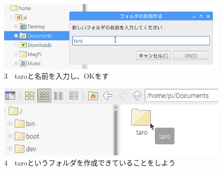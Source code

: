 \documentclass[a4paper,12pt]{jarticle}
\begin{document}
\begin{figure}[ht]
  \centering
  \begin{minipage}{0.8\textwidth}
  \includegraphics[width=\linewidth]{textbook-img039.png}
    3　taroと名前を入力し、OKをす
  \end{minipage}
  \vspace{\baselineskip}

  \centering
  \begin{minipage}{0.8\textwidth}
  \includegraphics[width=\linewidth]{textbook-img040.png}
    4　taroというフォルダを作成できていることをしよう
  \end{minipage}

\end{figure}
\clearpage
\end{document}
